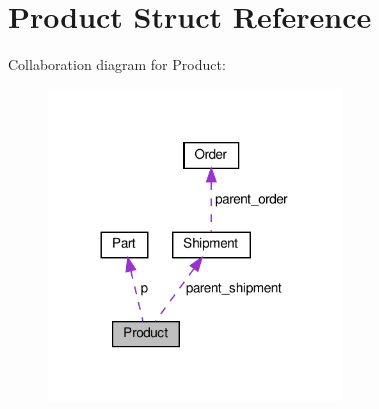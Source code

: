 \hypertarget{structProduct}{}\section{Product Struct Reference}
\label{structProduct}


Collaboration diagram for Product\+:
\nopagebreak
\begin{figure}[H]
\begin{center}
\leavevmode
\includegraphics[width=221pt]{structProduct__coll__graph}
\end{center}
\end{figure}

